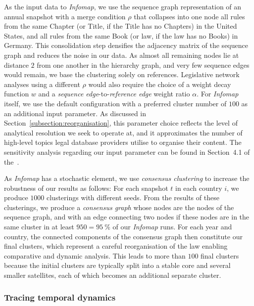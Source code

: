 As the input data to \emph{Infomap}, 
we use the sequence graph representation of an annual snapshot
with a merge condition $\rho$ that collapses into one node 
all rules from the same Chapter (or Title, if the Title has no Chapters) in the United States, 
and all rules from the same Book (or law, if the law has no Books) in Germany. 
This consolidation step densifies the adjacency matrix of the sequence graph and reduces the noise in our data.
As almost all remaining nodes lie at distance $2$ from one another in the hierarchy graph, 
and very few sequence edges would remain,
we base the clustering solely on references.
Legislative network analyses using a different $\rho$ would also require the choice of a weight decay function $w$ 
and a \emph{sequence edge}-to-\emph{reference edge} weight ratio $\alpha$. 
For \emph{Infomap} itself, 
we use the default configuration with a preferred cluster number of $100$ as an additional input parameter. 
As discussed in Section~\ref{subsection:reorganisation},
this parameter choice reflects the level of analytical resolution we seek to operate at, 
and it approximates the number of high-level topics legal database providers utilise to organise their content.
The sensitivity analysis regarding our input parameter can be found in Section~4.1 of the~\suppi. 

As \emph{Infomap} has a stochastic element, 
we use \emph{consensus clustering} \cite{lancichinetti2012} to increase the robustness of our results as follows: 
For each snapshot $t$ in each country $i$, 
we produce $1000$ clusterings with different seeds.
From the results of these clusterings, we produce a \emph{consensus graph}
whose nodes are the nodes of the sequence graph, 
and with an edge connecting two nodes if these nodes are in the same cluster in at least $950 = 95~\%$ of our \emph{Infomap} runs.
For each year and country, the connected components of the consensus graph then constitute our final clusters, 
which represent a careful reorganisation of the law enabling comparative and dynamic analysis.
This leads to more than $100$ final clusters 
because the initial clusters are typically split into a stable core and several smaller satellites, 
each of which becomes an additional separate cluster.

\subsubsection{Tracing temporal dynamics}\label{subsubsection:methods:temporal}

